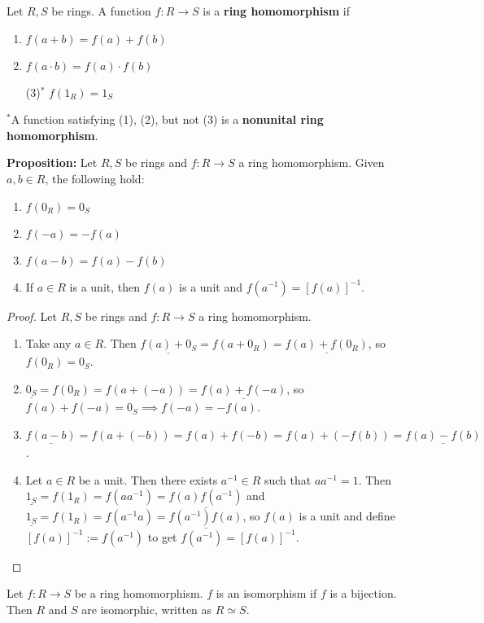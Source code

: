 \documentclass [12pt] {article}
\newenvironment{definition}[1]{\begin{tcolorbox}[title={Definition: #1},colback=blue!5!white,colframe=black!75!blue]}{\end{tcolorbox}}
\renewcommand{\bf}[1]{\textbf{{#1}}}
\newcommand{\ul}[1]{\underline{{#1}}}
\begin{document}
\begin{definition}{Homomorphism}
    Let $R, S$ be rings. A function $f : R \to S$ is a \bf{ring homomorphism} if
    \begin{enumerate}[label=(\arabic*)]
        \item $f(a + b) = f(a) + f(b)$
        \item $f(a \cdot b) = f(a) \cdot f(b)$
        \item[(3)$^*$] $f(1_R) = 1_S$
    \end{enumerate}
    $^*$A function satisfying (1), (2), but not (3) is a \bf{nonunital ring homomorphism}.
\end{definition}
\bf{Proposition:} Let $R, S$ be rings and $f : R \to S$ a ring homomorphism. Given $a, b \in R$, the
following hold:
\begin{enumerate}[label=(\arabic*)]
    \item $f(0_R) = 0_S$
    \item $f(-a) = -f(a)$
    \item $f(a - b) = f(a) - f(b)$
    \item If $a \in R$ is a unit, then $f(a)$ is a unit and $f(a^{-1}) = \left[ f(a) \right]^{-1}$.
\end{enumerate}
\begin{proof}
    Let $R, S$ be rings and $f : R \to S$ a ring homomorphism.
    \begin{enumerate}[label=(\arabic*)]
        \item Take any $a \in R$. Then $\ul{f(a) + 0_S} = f(a + 0_R) = \ul{f(a) + f(0_R)}$, so
            $f(0_R) = 0_S$.
        \item $\ul{0_S} = f(0_R) = f(a + (-a)) = \ul{f(a) + f(-a)}$, so
            $f(a) + f(-a) = 0_S \implies f(-a) = -f(a)$.
        \item $\ul{f(a - b)} = f(a + (-b)) = f(a) + f(-b) = f(a) + (-f(b)) = \ul{f(a) - f(b)}$.
        \item Let $a \in R$ be a unit. Then there exists $a^{-1} \in R$ such that $aa^{-1} = 1$.
            Then
            \newline
            $\ul{1_S} = f(1_R) = f(aa^{-1}) = \ul{f(a)f(a^{-1})}$ and
            $\ul{1_S} = f(1_R) = f(a^{-1}a) = \ul{f(a^{-1})f(a)}$, so $f(a)$ is a unit and define
            $\left[ f(a) \right]^{-1} := f(a^{-1})$ to get $f(a^{-1}) = \left[ f(a) \right]^{-1}$.
    \end{enumerate}
\end{proof}
\begin{definition}{Isomorphism}
    Let $f : R \to S$ be a ring homomorphism. $f$ is an isomorphism if $f$ is a bijection. Then
    $R$ and $S$ are isomorphic, written as $R \simeq S$.
\end{definition}
\end{document}
